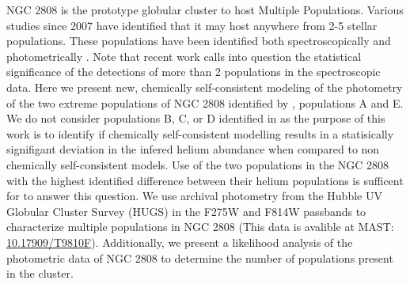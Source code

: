 NGC 2808 is the prototype globular cluster to host Multiple Populations.
Various studies since 2007 have identified that it may host anywhere from 2-5
stellar populations. These populations have been identified both
spectroscopically \citep[i.e.][]{Carretta2004, Carretta2006, Carretta2010,
Gratton2011, Carretta2015, Hong2021} and photometrically
\citep[i.e.][]{Piotto2007, Piotto2015, Milone2015, Milone2017, Pasquato2019}.
Note that recent work \citep{Valle2022} calls into question the statistical
significance of the detections of more than 2 populations in the spectroscopic
data. Here we present new, chemically self-consistent modeling of the
photometry of the two extreme populations of NGC 2808 identified by
\citet{Milone2015}, populations A and E. We do not consider populations B,
C, or D identified in \citet{Milone2015} as the purpose of this work is to
identify if chemically self-consistent modelling results in a statisically
signifigant deviation in the infered helium abundance when compared to non
chemically self-consistent models. Use of the two populations in the NGC 2808
with the highest identified difference between their helium populations is
sufficent for to answer this question.  We use archival photometry from the
Hubble UV Globular Cluster Survey (HUGS) \citep{Piotto2015, Milone2017} in the
F275W and F814W passbands to characterize multiple populations in NGC 2808
\citep{Milone2015, Milone2015b} (This data is avalible at MAST: \href{https://archive.stsci.edu/doi/resolve/resolve.html?doi=10.17909/T9810F}{10.17909/T9810F}). Additionally, we present a
likelihood analysis of the photometric data of NGC 2808 to determine the number
of populations present in the cluster.


